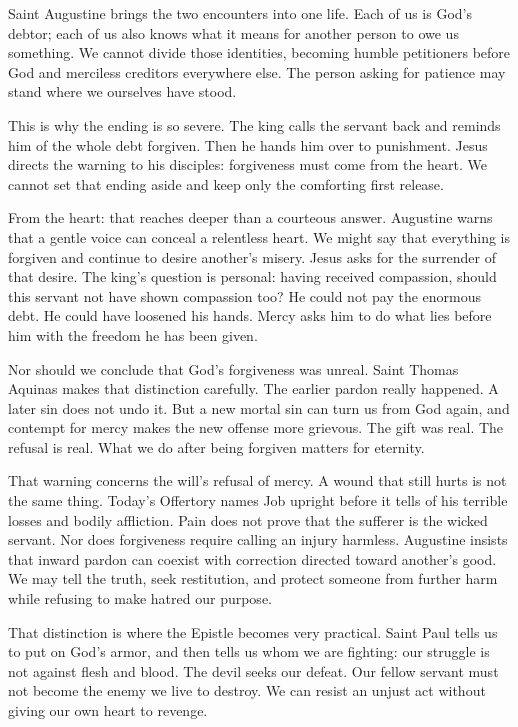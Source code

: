 Saint Augustine brings the two encounters into one life. Each of us is
God's debtor; each of us also knows what it means for another person to
owe us something. We cannot divide those identities, becoming humble
petitioners before God and merciless creditors everywhere else. The
person asking for patience may stand where we ourselves have stood.

This is why the ending is so severe. The king calls the servant back
and reminds him of the whole debt forgiven. Then he hands him over to
punishment. Jesus directs the warning to his disciples: forgiveness must
come from the heart. We cannot set that ending aside and keep only the
comforting first release.

From the heart: that reaches deeper than a courteous answer. Augustine
warns that a gentle voice can conceal a relentless heart. We might say
that everything is forgiven and continue to desire another's misery.
Jesus asks for the surrender of that desire. The king's question is
personal: having received compassion, should this servant not have shown
compassion too? He could not pay the enormous debt. He could have loosened
his hands. Mercy asks him to do what lies before him with the freedom
he has been given.

Nor should we conclude that God's forgiveness was unreal. Saint Thomas
Aquinas makes that distinction carefully. The earlier pardon really
happened. A later sin does not undo it. But a new mortal sin can
turn us from God again, and contempt for mercy makes the new offense
more grievous. The gift was real. The refusal is real. What we do after
being forgiven matters for eternity.

That warning concerns the will's refusal of mercy. A wound that still
hurts is not the same thing. Today's Offertory names Job upright before
it tells of his terrible losses and bodily affliction. Pain does not
prove that the sufferer is the wicked servant. Nor does forgiveness
require calling an injury harmless. Augustine insists that inward
pardon can coexist with correction directed toward another's good.
We may tell the truth, seek restitution, and protect someone from further
harm while refusing to make hatred our purpose.

That distinction is where the Epistle becomes very practical. Saint
Paul tells us to put on God's armor, and then tells us whom we are
fighting: our struggle is not against flesh and blood. The devil seeks
our defeat. Our fellow servant must not become the enemy we live to
destroy. We can resist an unjust act without giving our own heart to
revenge.

